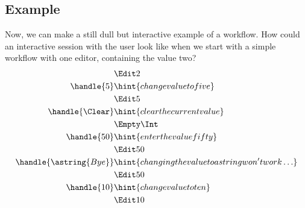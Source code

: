 \subsection{Example}

Now, we can make a still dull but interactive example of a workflow.
How could an interactive session with the user look like when we start with a simple workflow with one editor,
containing the value two?
\begin{align*}
    & \Edit 2 \\
  \handle{5} & \hint{change value to five} \\
    & \Edit 5 \\
  \handle{\Clear} & \hint{clear the current value} \\
    & \Empty \Int \\
  \handle{50} & \hint{enter the value fifty} \\
    & \Edit 50 \\
  \handle{\astring{Bye}} & \hint{changing the value to a string won't work\ldots} \\
    & \Edit 50 \\
  \handle{10} & \hint{change value to ten} \\
    & \Edit 10
\end{align*}
